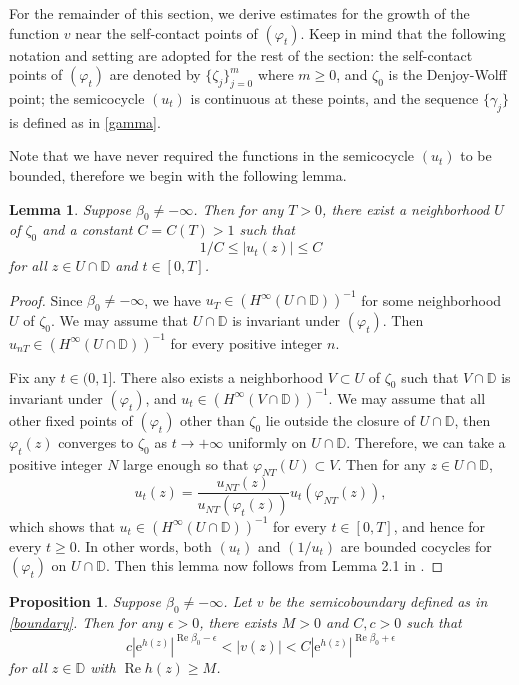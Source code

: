 \documentclass{amsart}
\theoremstyle{proclaim}
\newtheorem{lemma}[theorem]{Lemma}
\newtheorem{proposition}[theorem]{Proposition}
\theoremstyle{fancyproclaim}
\theoremstyle{definition}
\theoremstyle{fancystatement}
\numberwithin{equation}{section}
\begin{document}
For the remainder of this section, we derive estimates for the growth of the function $v$ near the self-contact points of $(\varphi_t)$. Keep in mind that the following notation and setting are adopted for the rest of the section: the self-contact points of $(\varphi_t)$ are denoted by $\{\zeta_j\}_{j=0}^m$ where $m\geq 0$, and $\zeta_0$ is the Denjoy-Wolff point; the semicocycle $(u_t)$ is continuous at these points, and the sequence $\{\gamma_j\}$ is defined as in \eqref{gamma}.

Note that we have never required the functions in the semicocycle $(u_t)$ to be bounded, therefore we begin with the following lemma.

\begin{lemma}\label{commombd}
Suppose $\beta_0\ne-\infty$. Then for any $T > 0$, there exist a neighborhood $U$ of $\zeta_0$ and a constant $C=C(T)>1$ such that $$1/C \leq |u_t(z)| \leq C$$ for all $z\in U\cap\mathbb{D}$ and $t \in[0,T]$. 
\end{lemma}

\begin{proof}
Since $\beta_0\ne-\infty$, we have $u_T \in (H^\infty(U\cap\mathbb{D})) ^{-1}$ for some neighborhood  $U$ of $\zeta_0$. We may assume that $U\cap\mathbb{D}$ is invariant under $(\varphi_t)$. Then  $u_{nT} \in (H^\infty( U\cap\mathbb{D})) ^{-1}$ for every positive integer $n$.

Fix any $t \in (0,1]$. There also exists a neighborhood $V\subset U$ of $\zeta_0$ such that $V\cap\mathbb{D}$ is invariant under $(\varphi_t)$, and $u_t \in (H^\infty( V\cap\mathbb{D})) ^{-1}$. We may assume that all other fixed points of $(\varphi_t)$ other than $\zeta_0$ lie outside the closure of $U\cap\mathbb{D}$, then $\varphi_t(z)$ converges to $\zeta_0$ as $t \to+\infty$ uniformly on $U\cap\mathbb{D}$. Therefore, we can take a positive integer $N$ large enough so that $\varphi_{NT}(U) \subset V$. Then for any $z\in U\cap\mathbb{D}$,
$$u_t(z)=\frac{u_{NT}(z)}{u_{NT}(\varphi_t(z))}  u_t(\varphi_{NT}(z)),$$
which shows that $u_t \in  (H^\infty( U\cap\mathbb{D})) ^{-1}$ for every $t \in [0,T]$, and hence for every $t\geq 0$. In other words, both $(u_t )$ and $(1/u_t )$ are bounded cocycles for $(\varphi_t)$ on  $U\cap\mathbb{D}$. Then this lemma now follows from Lemma 2.1 in \cite{Wolf}.
\end{proof}


\begin{proposition}\label{4zc}
Suppose $\beta_0\ne-\infty$. Let $v$ be the semicoboundary defined as in \eqref{boundary}. Then for any $\epsilon>0$, there exists $M > 0$ and $C,c > 0$ such that
$$c\left| \mathrm{e}^{h(z)}\right|^{ \operatorname{Re}\beta_0-\epsilon}<|v(z)|<C\left| \mathrm{e}^{h(z)}\right|^{ \operatorname{Re}\beta_0+\epsilon}$$
for all $z \in \mathbb{D}$ with $ \operatorname{Re}h(z) \geq M$.
\end{proposition}
\end{document}

